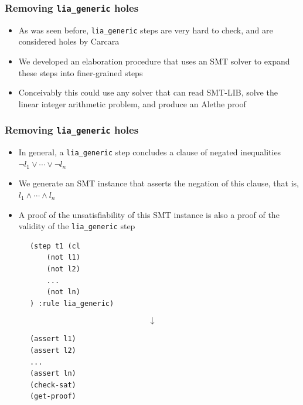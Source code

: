 \documentclass[usepdftitle=false,aspectratio=169]{beamer}
\newcommand\vitem{\vfill\item}
\begin{document}
\begin{frame}
  \frametitle{Removing \texttt{lia\_generic} holes}
  \begin{itemize}
    \item As was seen before, \texttt{lia\_generic} steps are very hard to
    check, and are considered holes by Carcara
    \vitem We developed an elaboration procedure that uses an SMT solver to
    expand these steps into finer-grained steps
    \vitem Conceivably this could use any solver that can read SMT-LIB, solve
    the linear integer arithmetic problem, and produce an Alethe proof
  \end{itemize}
\end{frame}

\begin{frame}[fragile]
  \frametitle{Removing \texttt{lia\_generic} holes}
  \begin{minipage}[c][0.6 \textheight]{0.65 \textwidth}
    \begin{itemize}
      \item In general, a \texttt{lia\_generic} step concludes a clause of
      negated inequalities $\neg l_1 \lor \cdots \lor \neg l_n$
      \vitem We generate an SMT instance that asserts the negation of this
      clause, that is, $l_1 \land \cdots \land l_n$
      \vitem A proof of the unsatisfiability of this SMT instance is also a
      proof of the validity of the \texttt{lia\_generic} step
    \end{itemize}
  \end{minipage}
  \hfill
  \begin{minipage}[c]{0.3 \textwidth}
    \begin{verbatim}
      (step t1 (cl
          (not l1)
          (not l2)
          ...
          (not ln)
      ) :rule lia_generic)
    \end{verbatim}
    $$\downarrow$$
    \begin{verbatim}
      (assert l1)
      (assert l2)
      ...
      (assert ln)
      (check-sat)
      (get-proof)
    \end{verbatim}
  \end{minipage}
\end{frame}
\end{document}
